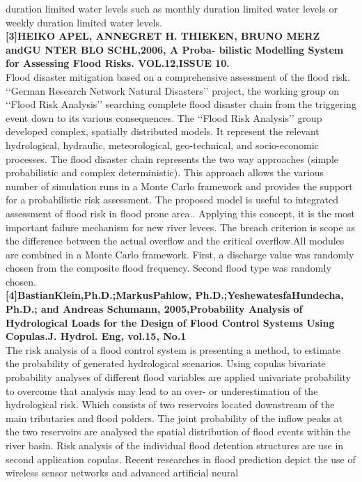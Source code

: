 \documentclass[a4paper,12pt]{report}
\begin{document}
\begin{itemize}
duration limited water levels such as monthly duration limited water levels or weekly duration limited water levels.\\
\textbf{[3]HEIKO APEL, ANNEGRET H. THIEKEN, BRUNO
MERZ andGU NTER BLO SCHL,2006, A Proba-
bilistic Modelling System for Assessing Flood Risks.
VOL.12,ISSUE 10.}\\
 Flood disaster mitigation based on a comprehensive assessment of the flood risk. ‘‘German Research
Network Natural Disasters’’ project, the working group on ‘‘Flood Risk Analysis’’ searching complete flood disaster
chain from the triggering event down to its various consequences. The ‘‘Flood Risk Analysis’’ group developed
complex, spatially distributed models. It represent the relevant hydrological, hydraulic, meteorological, geo-technical,
and socio-economic processes. The flood disaster chain represents the two way approaches (simple probabilistic and
complex deterministic). This approach allows the various number of simulation runs in a Monte Carlo framework and
provides the support for a probabilistic risk assessment. The proposed model is useful to integrated assessment of flood
risk in flood prone area.. Applying this concept, it is the most important failure mechanism for new river levees. The
breach criterion is scope as the difference between the actual overflow and the critical overflow.All modules are
combined in a Monte Carlo framework. First, a discharge value was randomly chosen from the composite flood
frequency. Second flood type was randomly chosen.\\
\textbf{[4]BastianKlein,Ph.D.;MarkusPahlow,
Ph.D.;YeshewatesfaHundecha, Ph.D.; and Andreas
Schumann, 2005,Probability Analysis of Hydrological
Loads for the Design of Flood Control Systems Using
Copulas.J. Hydrol. Eng, vol.15, No.1}\\
 The risk analysis of a flood control system is presenting a method, to estimate the probability of generated
hydrological scenarios. Using copulas bivariate probability analyses of different flood variables are applied univariate
probability to overcome that analysis may lead to an over- or underestimation of the hydrological risk. Which consists
of two reservoirs located downstream of the main tributaries and flood polders. The joint probability of the inflow
peaks at the two reservoirs are analysed the spatial distribution of flood events within the river basin. Risk analysis of
the individual flood detention structures are use in second application copulas.
Recent researches in flood prediction depict the use of
wireless sensor networks and advanced artificial neural

\end{itemize}
\end{document}
